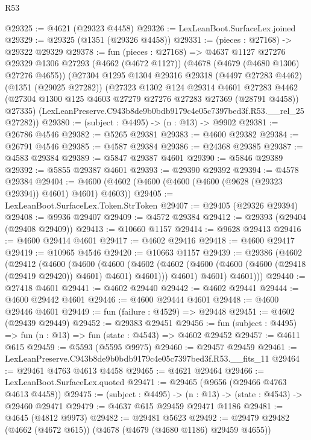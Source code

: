 \begin{lexlean}{R53}
\begin{coremodule}
@29325 := @4621 (@29323 @4458)
@29326 := LexLeanBoot.SurfaceLex.joined
@29329 := @29325 (@1351 (@29326 @4458))
@29331 := (pieces : @27168) -> @29322 @29329
@29378 := fun (pieces : @27168) =>
  @4637
    @1127
    @27276
    @29329
    @1306
    @27293
    (@4662 (@4672 @1127))
    (@4678 (@4679 (@4680 @1306) @27276 @4655))
    (@27304
      @1295
      @1304
      @29316
      @29318
      (@4497 @27283 @4462)
      (@1351 (@29025 @27282))
      (@27323
        @1302
        @124
        @29314
        @4601
        @27283
        @4462
        (@27304 @1300 @125 @4603 @27279 @27276 @27283 @27369 (@28791 @4458))
        @27335)
      (LexLeanPreserve.C943b8de9b0bdb9179c4e05c7397bed3f.R53.__rel_25 @27282))
@29380 := (subject : @4495) -> (n : @13) -> @9902
@29381 := @26786 @4546
@29382 := @5265 @29381
@29383 := @4600 @29382
@29384 := @26791 @4546
@29385 := @4587 @29384
@29386 := @24368 @29385
@29387 := @4583 @29384
@29389 := @5847 @29387 @4601
@29390 := @5846 @29389
@29392 := @5855 @29387 @4601
@29393 := @29390 @29392
@29394 := @4578 @29384
@29404 := @4600 (@4602 (@4600 (@4600 (@4600 (@9628 (@29323 @29394)) @4601) @4601) @4603))
@29405 := LexLeanBoot.SurfaceLex.Token.StrToken
@29407 := @29405 (@29326 @29394)
@29408 := @9936 @29407
@29409 := @4572 @29384
@29412 := @29393 (@29404 (@29408 @29409))
@29413 := @10660 @1157
@29414 := @9628 @29413
@29416 := @4600 @29414 @4601
@29417 := @4602 @29416
@29418 := @4600 @29417
@29419 := @10965 @4546
@29420 := @10663 @1157
@29439 := @29386
    (@4602
      (@29412
        (@4600
          (@4600
            (@4600
              (@4602 (@4602 (@4600 (@4600 (@4600 (@29418 (@29419 @29420)) @4601) @4601) @4601)))
              @4601)
            @4601)
          @4601)))
@29440 := @27418 @4601
@29441 := @4602 @29440
@29442 := @4602 @29441
@29444 := @4600 @29442 @4601
@29446 := @4600 @29444 @4601
@29448 := @4600 @29446 @4601
@29449 := fun (failure : @4529) => @29448
@29451 := @4602 (@29439 @29449)
@29452 := @29383 @29451
@29456 := fun (subject : @4495) => fun (n : @13) => fun (state : @4543) => @4602 @29452
@29457 := @4611 @615
@29459 := @5593 (@5595 @9975)
@29460 := @29457 @29459
@29461 := LexLeanPreserve.C943b8de9b0bdb9179c4e05c7397bed3f.R53.__fits_11
@29464 := @29461 @4763 @4613 @4458
@29465 := @4621 @29464
@29466 := LexLeanBoot.SurfaceLex.quoted
@29471 := @29465 (@9656 (@29466 @4763 @4613 @4458))
@29475 := (subject : @4495) -> (n : @13) -> (state : @4543) -> @29460 @29471
@29479 := @4637 @615 @29459 @29471 @1186
@29481 := @4645 (@4812 @9973)
@29482 := @29481 @5623
@29492 := @29479 @29482 (@4662 (@4672 @615)) (@4678 (@4679 (@4680 @1186) @29459 @4655))

\end{coremodule}
\end{lexlean}
